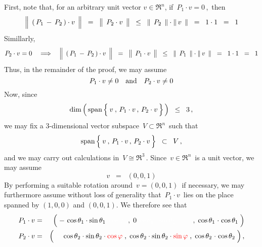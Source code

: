 First, note that, for an arbitrary unit vector $v \in \Re^{n}$,
if \,$P_{1} \cdot v = 0$\,,\, then
\begin{equation*}
\left\Vert\;\, (\,P_{1} \,\overset{{\color{white}.}}{-}\, P_{2}\,)\cdot v \,\;\right\Vert
\;\; = \;\;
	\left\Vert\;\, P_{2} \overset{{\color{white}.}}{\cdot} v \,\;\right\Vert
\;\; \leq \;\;
	\left\Vert\;\, P_{2} \,\;\right\Vert
	\cdot
	\left\Vert\, v \,\;\right\Vert
\;\; = \;\;
	1 \cdot 1
\;\; = \;\;
	1
\end{equation*}
Simillarly,
\begin{equation*}
P_{2} \cdot v = 0
\quad\Longrightarrow\quad
\left\Vert\;\, (\,P_{1} \,\overset{{\color{white}.}}{-}\, P_{2}\,)\cdot v \,\;\right\Vert
\;\; = \;\;
	\left\Vert\;\, P_{1} \overset{{\color{white}.}}{\cdot} v \,\;\right\Vert
\;\; \leq \;\;
	\left\Vert\;\, P_{1} \,\;\right\Vert
	\cdot
	\left\Vert\, v \,\;\right\Vert
\;\; = \;\;
	1 \cdot 1
\;\; = \;\;
	1
\end{equation*}
Thus, in the remainder of the proof, we may assume
\begin{equation*}
P_{1} \cdot v \neq 0
\quad\textnormal{and}\quad
P_{2} \cdot v \neq 0
\end{equation*}
Now, since
\begin{equation*}
\dim\left(\,\span\left\{\,\overset{{\color{white}-}}{v} \,,\, P_{1}\cdot v \,,\, P_{2}\cdot v\,\right\}\,\right)
\;\; \leq \;\;
	3\,,
\end{equation*}
we may fix a $3$-dimensional vector subspace \,$V \subset \Re^{n}$\, such that
\begin{equation*}
\span\left\{\,\overset{{\color{white}-}}{v} \,,\, P_{1}\cdot v \,,\, P_{2}\cdot v\,\right\}
\;\; \subset \;\;
	V\,,
\end{equation*}
and we may carry out calculations in \,$V \cong \Re^{3}$\,.
Since \,$v \in \Re^{n}$\, is a unit vector, we may assume
\begin{equation*}
v \;\; = \;\; (0,0,1)
\end{equation*}
By performing a suitable rotation around \,$v = (0,0,1)$\, if necessary,
we may furthermore assume without loss of generality that
\,$P_{1} \cdot v$\, lies on the place spanned by $(1,0,0)$ and $(0,0,1)$.
We therefore see that
\begin{eqnarray*}
P_{1}\cdot v
& = &
	\left(\;
		-\,\cos\theta_{1}\cdot\sin\theta_{1}{\color{white}\cdot\cos\varphi.}
		\; , \;
		0{\color{white}\cos\theta_{1}\cdot\sin\theta_{1}........}
		\; , \;
		\cos\theta_{1}\overset{{\color{white}1}}{\cdot}\cos\theta_{1}
		\;\right)
\\
P_{2}\cdot v
& = &
	\left(\;
		{\color{white}-}\,\cos\theta_{2}\cdot\sin\theta_{2}\cdot{\color{red}\cos\varphi}
		\; , \;
		\cos\theta_{2}\cdot\sin\theta_{2}\cdot{\color{red}\sin\varphi}
		\; , \;
		\cos\theta_{2}\overset{{\color{white}1}}{\cdot}\cos\theta_{2}
		\;\right),
\end{eqnarray*}
